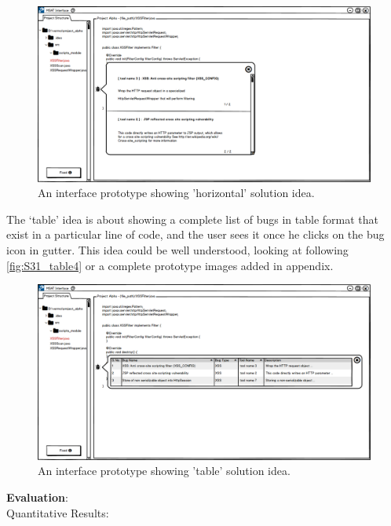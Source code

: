 \begin{figure}[hbt!]
	\centering
	\includegraphics[width=\linewidth]{figures/solution_ideas_snaps/S31_horizontal}
	\caption{An interface prototype showing 'horizontal' solution idea.}
	\label{fig:S31_horizontal4}
\end{figure} 

The ‘table’ idea is about showing a complete list of bugs in table format that exist in a particular line of code, and the user sees it once he clicks on the bug icon in gutter. This idea could be well understood, looking at following \autoref{fig:S31_table4} or a complete prototype images added in appendix. \\

\begin{figure}[hbt!]
	\centering
	\includegraphics[width=\linewidth]{figures/solution_ideas_snaps/S31_table}
	\caption{An interface prototype showing 'table' solution idea.}
	\label{fig:S31_table4}
\end{figure} 


\textbf{Evaluation}: \\

Quantitative Results: \\


